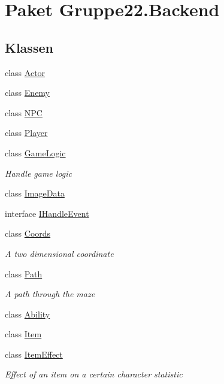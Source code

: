 \hypertarget{namespace_gruppe22_1_1_backend}{\section{Paket Gruppe22.\-Backend}
\label{namespace_gruppe22_1_1_backend}
}
\subsection*{Klassen}
\begin{DoxyCompactItemize}
\item 
class \hyperlink{class_gruppe22_1_1_backend_1_1_actor}{Actor}
\item 
class \hyperlink{class_gruppe22_1_1_backend_1_1_enemy}{Enemy}
\item 
class \hyperlink{class_gruppe22_1_1_backend_1_1_n_p_c}{N\-P\-C}
\item 
class \hyperlink{class_gruppe22_1_1_backend_1_1_player}{Player}
\item 
class \hyperlink{class_gruppe22_1_1_backend_1_1_game_logic}{Game\-Logic}
\begin{DoxyCompactList}\small\item\em Handle game logic \end{DoxyCompactList}\item 
class \hyperlink{class_gruppe22_1_1_backend_1_1_image_data}{Image\-Data}
\item 
interface \hyperlink{interface_gruppe22_1_1_backend_1_1_i_handle_event}{I\-Handle\-Event}
\item 
class \hyperlink{class_gruppe22_1_1_backend_1_1_coords}{Coords}
\begin{DoxyCompactList}\small\item\em A two dimensional coordinate \end{DoxyCompactList}\item 
class \hyperlink{class_gruppe22_1_1_backend_1_1_path}{Path}
\begin{DoxyCompactList}\small\item\em A path through the maze \end{DoxyCompactList}\item 
class \hyperlink{class_gruppe22_1_1_backend_1_1_ability}{Ability}
\item 
class \hyperlink{class_gruppe22_1_1_backend_1_1_item}{Item}
\item 
class \hyperlink{class_gruppe22_1_1_backend_1_1_item_effect}{Item\-Effect}
\begin{DoxyCompactList}\small\item\em Effect of an item on a certain character statistic \end{DoxyCompactList}\item 

\end{DoxyCompactItemize}
